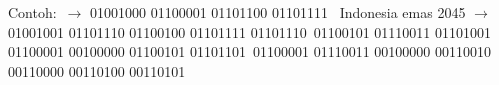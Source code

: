 \documentclass{article}
\begin{document}

Contoh:\
\nHalo $\rightarrow$ 01001000 01100001 01101100 01101111\
\vspace{10mm}
Indonesia emas 2045 $\rightarrow$01001001 01101110 01100100 01101111 01101110\
01100101 01110011 01101001 01100001 00100000 01100101 01101101\
01100001 01110011 00100000 00110010 00110000 00110100 00110101
\end{document}
